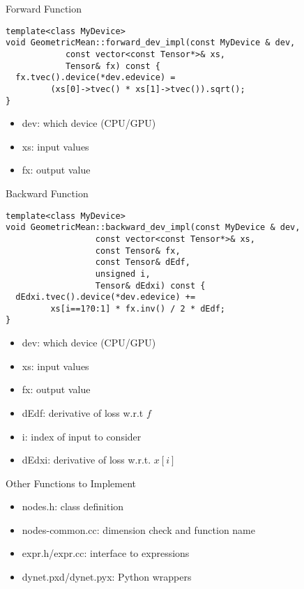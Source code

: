 \documentclass[compress]{beamer}
\begin{document}
\begin{frame}[fragile]{Forward Function}

\begin{verbatim}
template<class MyDevice>
void GeometricMean::forward_dev_impl(const MyDevice & dev,
            const vector<const Tensor*>& xs,
            Tensor& fx) const {
  fx.tvec().device(*dev.edevice) =
         (xs[0]->tvec() * xs[1]->tvec()).sqrt();
}
\end{verbatim}

\begin{itemize}
\item dev: which device (CPU/GPU)
\item xs: input values
\item fx: output value
\end{itemize}

\end{frame}


\begin{frame}[fragile]{Backward Function}

\begin{verbatim}
template<class MyDevice>
void GeometricMean::backward_dev_impl(const MyDevice & dev,
                  const vector<const Tensor*>& xs,
                  const Tensor& fx,
                  const Tensor& dEdf,
                  unsigned i,
                  Tensor& dEdxi) const {
  dEdxi.tvec().device(*dev.edevice) +=
         xs[i==1?0:1] * fx.inv() / 2 * dEdf;
}
\end{verbatim}

\begin{itemize}
\item dev: which device (CPU/GPU)
\item xs: input values
\item fx: output value
\item dEdf: derivative of loss w.r.t $f$
\item i: index of input to consider
\item dEdxi: derivative of loss w.r.t. $x[i]$
\end{itemize}

\end{frame}


\begin{frame}{Other Functions to Implement}

\begin{itemize}
\item nodes.h: class definition
\item nodes-common.cc: dimension check and function name
\item expr.h/expr.cc: interface to expressions
\item dynet.pxd/dynet.pyx: Python wrappers
\end{itemize}

\end{frame}
\end{document}

